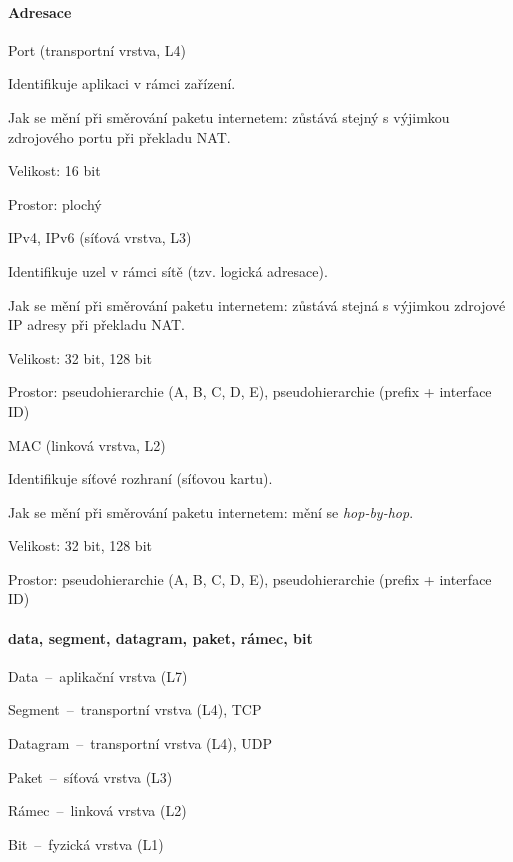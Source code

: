 \paragraph*{Adresace} \begin{compactitem}
    \item Port (transportní vrstva, L4) \begin{compactitem}
        \item Identifikuje aplikaci v rámci zařízení.
        \item Jak se mění při směrování paketu internetem: zůstává stejný s výjimkou zdrojového portu při překladu NAT.
        \item Velikost: 16 bit
        \item Prostor: plochý
    \end{compactitem}
    \item IPv4, IPv6 (síťová vrstva, L3) \begin{compactitem}
        \item Identifikuje uzel v rámci sítě (tzv. logická adresace).
        \item Jak se mění při směrování paketu internetem: zůstává stejná s výjimkou zdrojové IP adresy při překladu NAT.
        \item Velikost: 32 bit, 128 bit
        \item Prostor: pseudohierarchie (A, B, C, D, E), pseudohierarchie (prefix + interface ID)
    \end{compactitem}
    \item MAC (linková vrstva, L2) \begin{compactitem}
        \item Identifikuje síťové rozhraní (síťovou kartu).
        \item Jak se mění při směrování paketu internetem: mění se \textit{hop-by-hop}.
        \item Velikost: 32 bit, 128 bit
        \item Prostor: pseudohierarchie (A, B, C, D, E), pseudohierarchie (prefix + interface ID)
    \end{compactitem}
\end{compactitem}

\paragraph*{data, segment, datagram, paket, rámec, bit} \begin{compactitem}
    \item Data~--~aplikační vrstva (L7)
    \item Segment~--~transportní vrstva (L4), TCP
    \item Datagram~--~transportní vrstva (L4), UDP
    \item Paket~--~síťová vrstva (L3)
    \item Rámec~--~linková vrstva (L2)
    \item Bit~--~fyzická vrstva (L1)
\end{compactitem}

